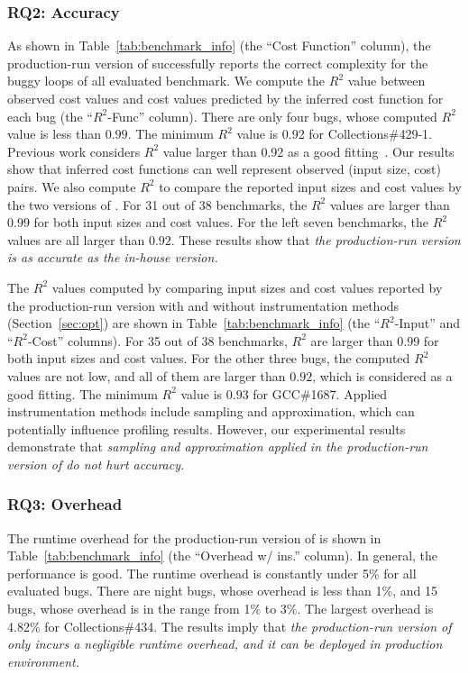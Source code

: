 \subsubsection{RQ2: Accuracy}
As shown in Table~\ref{tab:benchmark_info} (the ``Cost Function'' column),
the production-run version of \Tool successfully 
reports the correct complexity for the buggy loops of 
all evaluated benchmark. 
We compute the $R^2$ value between observed cost values and 
cost values predicted by the inferred cost function for each bug 
(the ``$R^2$-Func'' column).  
There are only four bugs, whose computed $R^2$ value is less than $0.99$.
The minimum $R^2$ value is 0.92 for Collections\#429-1. 
Previous work considers $R^2$ value larger than 0.92 
as a good fitting~\cite{rsquare-value}.
Our results show that inferred cost functions can well represent 
observed (input size, cost) pairs. 
We also compute $R^2$ to compare the reported input sizes 
and cost values by the two versions of \Tool. 
For 31 out of 38 benchmarks, 
the $R^2$ values are larger than $0.99$ for both input sizes and cost values. 
For the left seven benchmarks, the $R^2$ values are all larger than $0.92$. 
These results show that \emph{the production-run version is 
as accurate as the in-house version. 
}

The $R^2$ values computed by comparing input sizes and cost values 
reported by the production-run version with and without 
instrumentation methods (Section~\ref{sec:opt}) are shown in 
Table~\ref{tab:benchmark_info} 
(the ``$R^2$-Input'' and ``$R^2$-Cost'' columns).
For 35 out of 38 benchmarks, $R^2$ are larger than $0.99$ for 
both input sizes and cost values. 
For the other three bugs, the computed $R^2$ values are not low, 
and all of them are larger than $0.92$, which is considered as a good fitting. 
The minimum $R^2$ value is $0.93$ for GCC\#1687.
Applied instrumentation methods include
sampling and approximation, which can potentially influence profiling results.
However, our experimental results demonstrate that \emph{sampling and approximation 
applied in the production-run version of \Tool do not hurt accuracy. 
}



\subsubsection{RQ3: Overhead}

The runtime overhead for the production-run version of \Tool is 
shown in Table~\ref{tab:benchmark_info} (the ``Overhead w/ ins.'' column). 
In general, the performance is good. 
The runtime overhead is constantly 
under 5\% for all evaluated bugs. 
There are night bugs, whose overhead is less than 1\%, 
and 15 bugs, whose overhead is in the range from 1\% to 3\%.  
The largest overhead is 4.82\% for Collections\#434. 
The results imply that \emph{the production-run version of 
\Tool only incurs a negligible runtime overhead, 
and it can be deployed in production environment.}

